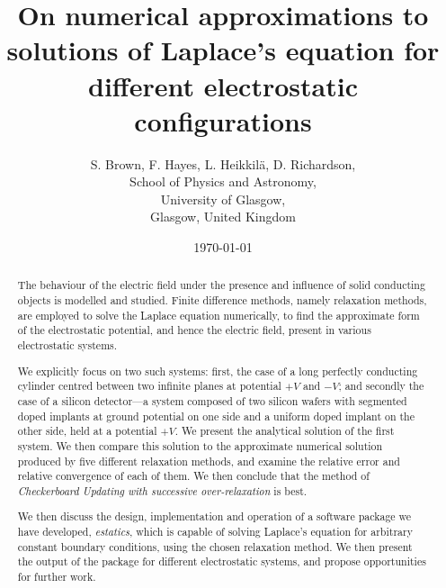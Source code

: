 \documentclass[12pt, a4paper]{article}
\begin{document}
\title{On numerical approximations to solutions of Laplace's equation for different
electrostatic configurations}
\author{S. Brown, F. Hayes, L. Heikkil{\"a}, D. Richardson,\\
	School of Physics and Astronomy,\\
	University of Glasgow,\\
	Glasgow, United Kingdom}
\date{\today}
\maketitle

\begin{abstract}

The behaviour of the electric field under the presence and influence of solid
conducting objects is modelled and studied. Finite difference methods, namely
relaxation methods, are employed to solve the Laplace equation numerically,
to find the approximate form of the electrostatic potential, and hence the electric
field, present in various electrostatic systems.

We explicitly focus on two such systems: first, the case of a long perfectly conducting
cylinder centred between two infinite planes at potential $+V$ and $-V$; and secondly 
the case of a silicon detector---a system composed of two silicon wafers with segmented
doped implants at ground potential on one side and a uniform doped implant on the
other side, held at a potential $+V$. We present the analytical solution of the first
system. We then compare this solution to the approximate numerical solution produced
by five different relaxation methods, and examine the relative error and relative
convergence of each of them. We then conclude that the method of 
\emph{Checkerboard Updating with successive over-relaxation} is best.

We then discuss the design, implementation and operation of a software package we have
developed, \emph{estatics}, which is capable of solving Laplace's equation for arbitrary
constant boundary conditions, using the chosen relaxation method. We then present the
output of the package for different electrostatic systems, and propose opportunities
for further work.

\end{abstract}

\newpage                       %
\tableofcontents               %
\newpage                       %
\end{document}
